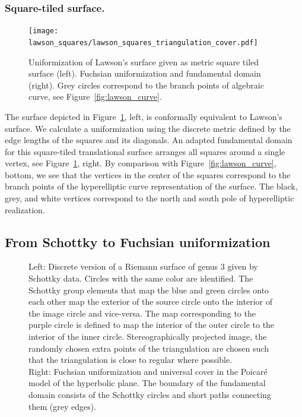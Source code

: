 \documentclass[Thesis]{subfiles}
\begin{document}
\subsubsection{Square-tiled surface.}

\begin{figure}
	\centering
	\resizebox{!}{6cm} {
	\texttt{[image: lawson\_squares/lawson\_squares\_triangulation\_cover.pdf]}
	}
	\caption{Uniformization of Lawson's surface given as metric square tiled surface (left). Fuchsian
uniformization and fundamental domain (right). Grey circles correspond to the branch points of algebraic curve, see Figure~\ref{fig:lawson_curve}.}
\label{fig:lawson_squares}
\end{figure}

The surface depicted in Figure~\ref{fig:lawson_squares}, left, is conformally equivalent to Lawson's surface. We calculate a uniformization using the discrete metric defined by the edge lengths of the squares and its diagonals. An adapted fundamental domain for this square-tiled translational surface arranges all squares around a single vertex, see Figure~\ref{fig:lawson_squares}, right. By comparison with Figure~\ref{fig:lawson_curve}, bottom, we see that the vertices in the center of the squares correspond to the branch points of the hyperelliptic curve representation of the surface. The black, grey, and white vertices correspond to the north and south pole of hyperelliptic realization.


\subsection{From Schottky to Fuchsian uniformization}

\begin{figure}
\centering
{}
\caption{
Left: Discrete version of a Riemann surface of genus $3$ given by Schottky data.
Circles with the same color are identified.
The Schottky group elements that map the blue and green circles onto each other map the exterior of the source circle onto the interior of the image circle and vice-versa.
The map corresponding to the purple circle is defined to map the interior of the outer circle to the interior of the inner circle. Stereographically projected image, the randomly chosen extra points of the triangulation are chosen such that the triangulation is close to regular where possible.
\\
Right: Fuchsian uniformization and universal cover in the Poicar\'e model of the hyperbolic plane. The boundary of the fundamental domain consists of  the Schottky circles and short paths connecting them (grey edges).}
\end{figure}
\end{document}
